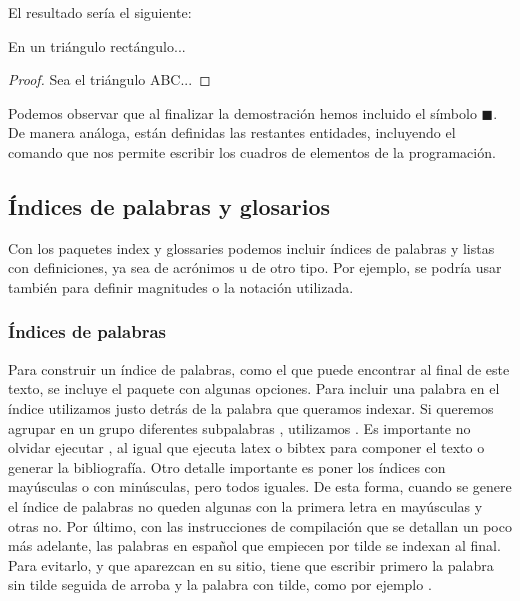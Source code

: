 El resultado sería el siguiente:
\begin{teor}
En un triángulo rectángulo...
\end{teor}
\begin{proof}
Sea el triángulo ABC...
\end{proof}

Podemos observar que al finalizar la demostración hemos incluido el símbolo $\blacksquare$. De manera análoga, están definidas las restantes entidades, incluyendo el comando que nos permite escribir los cuadros de elementos de la programación.

\subsection{Índices de palabras y glosarios}
Con los paquetes index y glossaries podemos incluir índices de palabras y listas con definiciones, ya sea de acrónimos u de otro tipo. Por ejemplo, se podría usar también para definir magnitudes o la notación utilizada.
 
\subsubsection{Índices de palabras}
Para construir un índice de palabras, como el que puede encontrar al final de este texto, se incluye el paquete  con algunas opciones. Para incluir una palabra  en el índice utilizamos    justo detrás de la palabra que queramos indexar. Si queremos agrupar en un grupo diferentes subpalabras , utilizamos . Es importante no olvidar ejecutar , al igual que ejecuta latex o bibtex para componer el texto o generar la bibliografía. Otro detalle importante es poner los índices con mayúsculas o con minúsculas, pero todos iguales. De esta forma, cuando se genere el índice de palabras no queden algunas con la primera letra en mayúsculas y otras no. Por último, con las instrucciones de compilación que se detallan un poco más adelante, las palabras en español que empiecen por tilde se indexan al final. Para evitarlo, y que aparezcan en su sitio, tiene que escribir primero la palabra sin tilde seguida de arroba y la palabra con tilde, como por ejemplo . 

